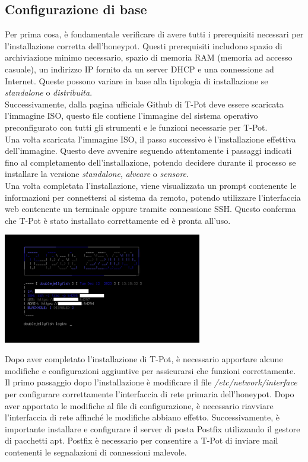 \documentclass[12pt,a4paper,oneside,onecolumn,openright]{book}
\begin{document}
	\subsection{Configurazione di base}
	Per prima cosa, è fondamentale verificare di avere tutti i prerequisiti necessari per l'installazione corretta dell'honeypot.  Questi prerequisiti includono spazio di archiviazione minimo necessario, spazio di memoria RAM (memoria ad accesso casuale), un indirizzo IP fornito da un server DHCP e una connessione ad Internet. Queste possono variare in base alla tipologia di installazione se \textit{standalone} o \textit{distribuita}.\\
	Successivamente, dalla pagina ufficiale Github di T-Pot deve essere scaricata l'immagine ISO, questo file contiene l'immagine del sistema operativo preconfigurato con tutti gli strumenti e le funzioni necessarie per T-Pot.\\
	Una volta scaricata l'immagine ISO, il passo successivo è l'installazione effettiva dell'immagine. Questo deve avvenire seguendo attentamente i passaggi indicati fino al completamento dell'installazione, potendo decidere durante il processo se installare la versione \textit{standalone}, \textit{alveare} o \textit{sensore}.\\
	Una volta completata l'installazione, viene visualizzata un prompt contenente le informazioni per connettersi al sistema da remoto, potendo utilizzare l'interfaccia web contenente un terminale oppure tramite connessione SSH. Questo conferma che T-Pot è stato installato correttamente ed è pronta all'uso.\\
	\begin{center}
		\includegraphics[width=0.65\textwidth]{image/fineInstallazione.png}
	\end{center}
	Dopo aver completato l'installazione di T-Pot, è necessario apportare alcune modifiche e configurazioni aggiuntive per assicurarsi che funzioni correttamente.\\
	Il primo passaggio dopo l'installazione è modificare il file \textit{/etc/network/interface} per configurare correttamente l'interfaccia di rete primaria dell'honeypot. Dopo aver apportato le modifiche al file di configurazione, è necessario riavviare l'interfaccia di rete affinché le modifiche abbiano effetto. Successivamente, è importante installare e configurare il server di posta Postfix utilizzando il gestore di pacchetti apt. Postfix è necessario per consentire a T-Pot di inviare mail contenenti le segnalazioni di connessioni malevole. \\
\end{document}
